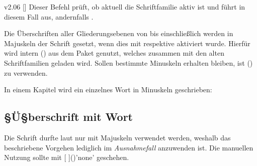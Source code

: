 \begin{Obsolete}{v2.06}{%
  []
}%
\printobsoletelist%
%
Dieser Befehl prüft, ob aktuell die Schriftfamilie \DIN aktiv ist und führt in 
diesem Fall  aus, andernfalls . 
\end{Obsolete}



%
Die Überschriften aller Gliederungsebenen von  bis einschließlich 
 werden in Majuskeln der Schrift \DIN gesetzt, wenn dies 
mit  respektive  aktiviert 
wurde. Hierfür wird intern () aus 
dem Paket  genutzt, welches zusammen mit den alten 
Schriftfamilien geladen wird. Sollen bestimmte Minuskeln erhalten bleiben, ist 
() zu verwenden.
%
\begin{Example}
In einem Kapitel wird ein einzelnes Wort in Minuskeln geschrieben:
\begin{Code}[escapechar=§]
\chapter{§Ü§berschrift mit  Wort}
\end{Code}
\end{Example}
%
Die Schrift \DIN durfte laut \CD nur mit Majuskeln verwendet werden, weshalb 
das beschriebene Vorgehen lediglich im \emph{Ausnahmefall} anzuwenden ist. 
Die manuellen Nutzung sollte mit 
[%
]()'none' geschehen.

